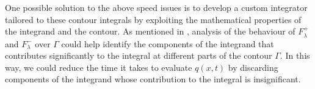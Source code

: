 \documentclass[11pt, oneside, a4paper]{article}
\begin{document}
One possible solution to the above speed issues is to develop a custom integrator tailored to these contour integrals by exploiting the mathematical properties of the integrand and the contour. As mentioned in \cite{Miller2018}, analysis of the behaviour of $F_\lambda^+$ and $F_\lambda^-$ over $\Gamma$ could help identify the components of the integrand that contributes significantly to the integral at different parts of the contour $\Gamma$. In this way, we could reduce the time it takes to evaluate $q(x,t)$ by discarding components of the integrand whose contribution to the integral is insignificant.

\newpage
{}

\newpage

% 

\end{document}
